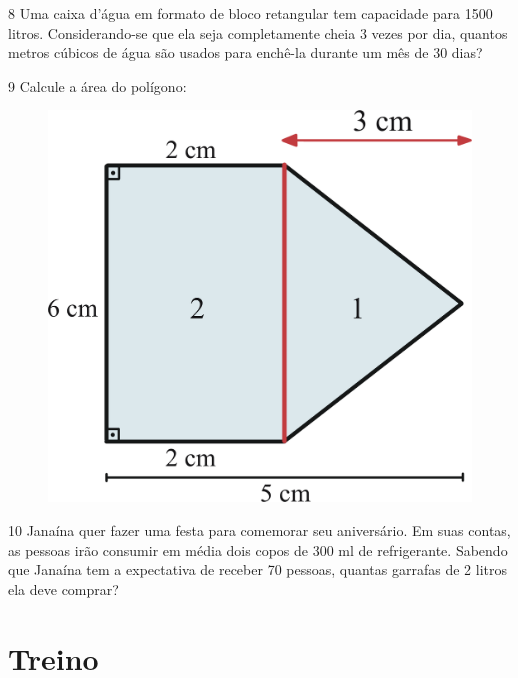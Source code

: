 \num{8} Uma caixa d'água em formato de bloco retangular tem
capacidade para 1500 litros. Considerando-se que ela seja completamente
cheia 3 vezes por dia, quantos metros cúbicos de água são usados para
enchê-la durante um mês de 30 dias?

\begin{emptybox}

\end{emptybox}

\num{9} Calcule a área do polígono:

\begin{figure}[htpb!]
\centering
\includegraphics[width=.35\textwidth]{./ilustras-mat/modulo_14-atividade_9_resposta.png}
\end{figure}

\begin{emptybox}

\end{emptybox}

\num{10} Janaína quer fazer uma festa para comemorar seu aniversário. Em suas
contas, as pessoas irão consumir em média dois copos de 300 ml de refrigerante.
Sabendo que Janaína tem a expectativa de receber 70 pessoas, quantas garrafas de
2 litros ela deve comprar?

\begin{emptybox}
\end{emptybox}

\section*{Treino}

